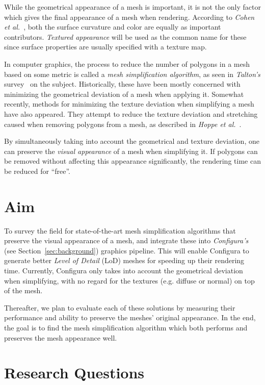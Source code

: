 While the geometrical appearance of a mesh is important, it is not the only factor which gives the final appearance of a mesh when rendering. According to \emph{Cohen et al.}~\cite{cohen1998appearance}, both the surface curvature and color are equally as important contributors. \emph{Textured appearance} will be used as the common name for these since surface properties are usually specified with a texture map.

In computer graphics, the process to reduce the number of polygons in a mesh based on some metric is called a \emph{mesh simplification algorithm}, as seen in \emph{Talton's} survey~\cite{talton2004short} on the subject. Historically, these have been mostly concerned with minimizing the geometrical deviation of a mesh when applying it. Somewhat recently, methods for minimizing the texture deviation when simplifying a mesh have also appeared. They attempt to reduce the texture deviation and stretching caused when removing polygons from a mesh, as described in \emph{Hoppe et al.}~\cite{hoppe1996progressive}.

By simultaneously taking into account the geometrical and texture deviation, one can preserve the \emph{visual appearance} of a mesh when simplifying it. If polygons can be removed without affecting this appearance significantly, the rendering time can be reduced for ``free''.

\section{Aim}
\label{sec:aim}

To survey the field for state-of-the-art mesh simplification algorithms that preserve the visual appearance of a mesh, and integrate these into \emph{Configura's} (see Section~\ref{sec:background}) graphics pipeline. This will enable Configura to generate better \emph{Level of Detail} (LoD) meshes for speeding up their rendering time. Currently, Configura only takes into account the geometrical deviation when simplifying, with no regard for the textures (e.g. diffuse or normal) on top of the mesh.

Thereafter, we plan to evaluate each of these solutions by measuring their performance and ability to preserve the meshes' original appearance. In the end, the goal is to find the mesh simplification algorithm which both performs and preserves the mesh appearance well.

\section{Research Questions}
\label{sec:research-questions}

